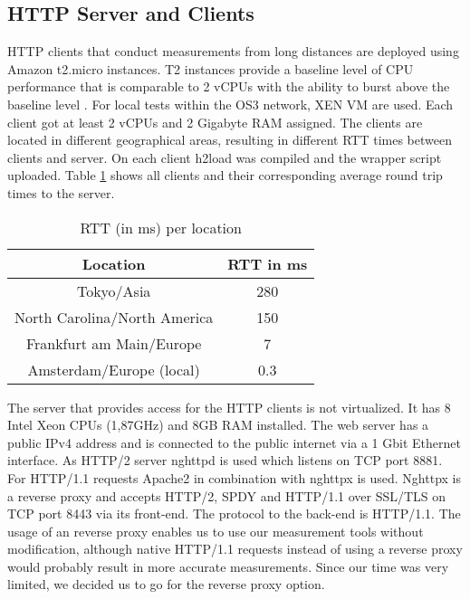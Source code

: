 \subsection{HTTP Server and Clients}
\label{subsec:server_client}
HTTP clients that conduct measurements from long distances are deployed using Amazon t2.micro instances. T2 instances provide a baseline level of CPU performance that is comparable to 2 vCPUs with the ability to burst above the baseline level \cite{amazon-ts}. For local tests within the OS3 network, XEN VM are used. Each client got at least 2 vCPUs and 2 Gigabyte RAM assigned. The clients are located in different geographical areas, resulting in different RTT times between clients and server. On each client h2load was compiled and the wrapper script uploaded. Table \ref{table:locations} shows all clients and their corresponding average round trip times to the server.

\begin{table}[h]
	\centering
\begin{tabular}{ | c | c | }

\hline
\textbf{Location} & \textbf{RTT in ms}\\ \hline \hline
Tokyo/Asia &  280\\ \hline
North Carolina/North America &  150\\ \hline 
Frankfurt am Main/Europe &  7\\ \hline
Amsterdam/Europe (local) &  0.3\\

\hline
\end{tabular}
\caption{RTT (in ms) per location}
\label{table:locations}
\end{table}

The server that provides access for the HTTP clients is not virtualized. It has 8 Intel Xeon CPUs (1,87GHz) and 8GB RAM installed. The web server has a public IPv4 address and is connected to the public internet via a 1 Gbit Ethernet interface. As HTTP/2 server nghttpd \cite{nghttp} is used which listens on TCP port 8881. For HTTP/1.1 requests Apache2 \cite{apache2} in combination with nghttpx \cite{nghttpx} is used. Nghttpx is a reverse proxy and accepts HTTP/2, SPDY and HTTP/1.1 over SSL/TLS on TCP port 8443 via its front-end. The protocol to the back-end is HTTP/1.1. The usage of an reverse proxy enables us to use our measurement tools without modification, although native HTTP/1.1 requests instead of using a reverse proxy would probably result in more accurate measurements. Since our time was very limited, we decided us to go for the reverse proxy option.

